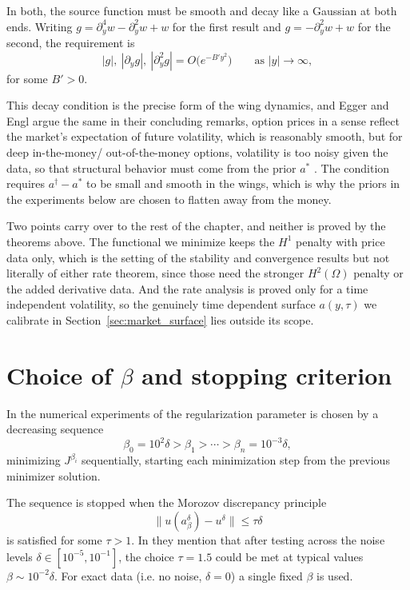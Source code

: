 In both, the source function must be smooth and decay like a Gaussian at both ends.
Writing $g = \partial_y^4 w - \partial_y^2 w + w$ for the first result
and $g = -\partial_y^2 w + w$ for the second, the requirement is
\begin{equation}\label{eq:source_decay}
    |g|,\ |\partial_y g|,\ |\partial_y^2 g| = O\bigl(e^{-B' y^2}\bigr)
    \qquad \text{as } |y| \to \infty,
\end{equation}
for some $B' > 0$.

This decay condition is the precise form of the wing dynamics,
and Egger and Engl argue the same in their concluding remarks,
option prices in a sense reflect the market's expectation of future volatility,
which is reasonably smooth,
but for deep in-the-money/ out-of-the-money options,
volatility is too noisy given the data,
so that structural behavior must come from the prior $a^*$ \cite{egger2005tikhonov}.
The condition requires $a^\dagger - a^*$ to be small and smooth in the wings,
which is why the priors in the experiments below are chosen to flatten away from the money.

Two points carry over to the rest of the chapter, and neither is proved by the theorems above.
The functional we minimize keeps the $H^1$ penalty with price data only,
which is the setting of the stability and convergence results but not literally of either rate theorem,
since those need the stronger $H^2(\Omega)$ penalty or the added derivative data.
And the rate analysis is proved only for a time independent volatility,
so the genuinely time dependent surface $a(y,\tau)$ we calibrate in Section~\ref{sec:market_surface} lies outside its scope.

\section{Choice of $\beta$ and stopping criterion}\label{sec:beta_choice}

In the numerical experiments of \cite{egger2005tikhonov} the regularization parameter
is chosen by a decreasing sequence
\begin{equation*}
    \beta_0 = 10^{2}\delta > \beta_1 > \cdots > \beta_n = 10^{-3}\delta,
\end{equation*}
minimizing $J^{\beta_i}$ sequentially,
starting each minimization step from the previous minimizer solution.

The sequence is stopped when the Morozov discrepancy principle
\begin{equation*}
    \|u(a^\delta_\beta) - u^\delta\| \le \tau\delta
\end{equation*}
is satisfied for some $\tau > 1$.
In \cite{egger2005tikhonov} they mention that after testing across the noise levels $\delta \in [10^{-5}, 10^{-1}]$,
the choice $\tau = 1.5$ could be met at typical values $\beta \sim 10^{-2}\delta$.
For exact data (i.e. no noise, $\delta = 0$) a single fixed $\beta$ is used.

